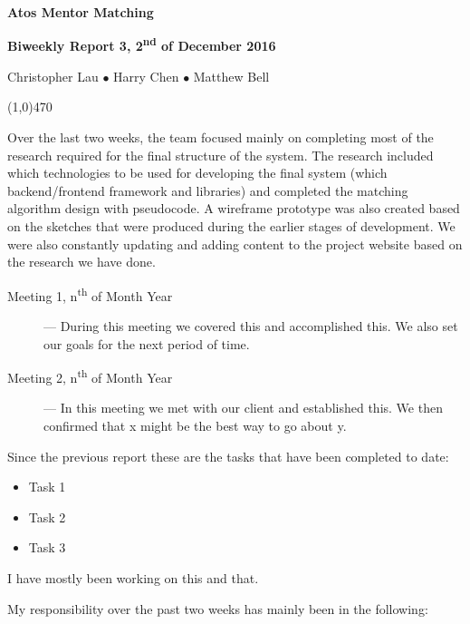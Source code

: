 \documentclass[11pt]{report}
\begin{document}
\centerline{{\LARGE \bf Atos Mentor Matching}}

\centerline{ \large \bf Biweekly Report 3, 2\textsuperscript{nd} of December 2016}
\centerline{ Christopher Lau $\bullet$ Harry Chen $\bullet$ Matthew Bell }
\noindent
\line(1,0){470}\\


\smallskip

\noindent
Over the last two weeks, the team focused mainly on completing most of the research required for the final structure of the system. The research included which technologies to be used for developing the final system (which backend/frontend framework and libraries) and completed the matching algorithm design with pseudocode. A wireframe prototype was also created based on the sketches that were produced during the earlier stages of development. We were also constantly updating and adding content to the project website based on the research we have done.

\bigskip
{}
\smallskip

\begin{description}
  \item[Meeting 1, n\textsuperscript{th} of Month Year] --- During this meeting we covered this and accomplished this. We also set our goals for the next period of time.
  \item[Meeting 2, n\textsuperscript{th} of Month Year] --- In this meeting we met with our client and established this. We then confirmed that x might be the best way to go about y.
\end{description}

\bigskip
{}
\smallskip

\noindent
Since the previous report these are the tasks that have been completed to date:
\begin{itemize}
  \item Task 1
  \item Task 2
  \item Task 3
\end{itemize}

\bigskip
{}
\smallskip

\noindent
I have mostly been working on this and that. \\

\bigskip
{}
\smallskip

\noindent
My responsibility over the past two weeks has mainly been in the following:
\end{document}
